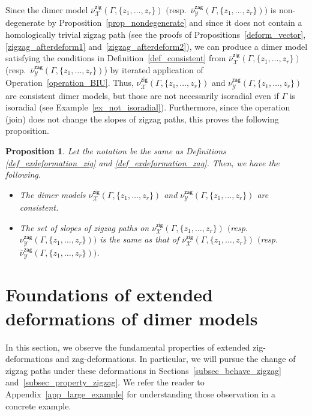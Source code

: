 \documentclass[11pt]{article}
\numberwithin{equation}{section}
\numberwithin{equation}{section}
\numberwithin{figure}{section}
\numberwithin{table}{section}
\newtheorem{Proposition}[Theorem]{Proposition}
 { \theoremstyle{definition}
\newtheorem{Definition}[Theorem]{Definition}
\newtheorem{Note}[Theorem]{Note}
\newtheorem{Example}[Theorem]{Example}
\newtheorem{Remark}[Theorem]{Remark}
\newtheorem{observation}[Theorem]{Observation}
\newtheorem{operation}[Theorem]{Operation}
\newtheorem{setting}[Theorem]{Setting}}
\newcommand{\calX}{\mathcal{X}}
\newcommand{\calY}{\mathcal{Y}}
\newcommand{\zig}{\mathsf{zig}}
\newcommand{\zag}{\mathsf{zag}}
\begin{document}
Since the dimer model $\overline{\nu}^\zig_\calX(\Gamma, \{z_1,\dots,z_r\})$ $($resp.\ $\overline{\nu}^\zag_\calY(\Gamma, \{z_1,\dots,z_r\})$$)$ is non-degenerate by Proposition~\ref{prop_nondegenerate}
and since it does not contain a homologically trivial zigzag path (see the proofs of Propositions~\ref{deform_vector}, \ref{zigzag_afterdeform1} and~\ref{zigzag_afterdeform2}),
we can produce a dimer model satisfying the conditions in Definition~\ref{def_consistent}
from $\overline{\nu}^\zig_\calX(\Gamma, \{z_1,\dots,z_r\})$ (resp.\ $\overline{\nu}^\zag_\calY(\Gamma, \{z_1,\dots,z_r\})$)
by iterated application of Operation~\ref{operation_BIU}.
Thus, $\nu^\zig_\calX(\Gamma, \{z_1,\dots,z_r\})$ and $\nu^\zag_\calY(\Gamma, \{z_1,\dots,z_r\})$ are consistent dimer models, but those are not necessarily isoradial even if $\Gamma$ is isoradial (see Example~\ref{ex_not_isoradial}).
Furthermore, since the operation (join) does not change the slopes of zigzag paths, this proves the following proposition.

\begin{Proposition}\label{prop_make_consistent}
Let the notation be the same as Definitions {\rm \ref{def_exdeformation_zig}} and {\rm \ref{def_exdeformation_zag}}.
Then, we have the following.
\begin{itemize}\itemsep=0pt
\item[\rm (1)] The dimer models $\nu^\zig_\calX(\Gamma, \{z_1,\dots,z_r\})$ and $\nu^\zag_\calY(\Gamma, \{z_1,\dots,z_r\})$ are consistent.
\item[\rm (2)] The set of slopes of zigzag paths on $\nu^\zig_\calX(\Gamma, \{z_1,\dots,z_r\})$ $($resp.\ $\nu^\zag_\calY(\Gamma, \{z_1,\dots,z_r\})$$)$
is the same as that of $\overline{\nu}^\zig_\calX(\Gamma, \{z_1,\dots,z_r\})$ $($resp.\ $\overline{\nu}^\zag_\calY(\Gamma, \{z_1,\dots,z_r\})$$)$.
\end{itemize}
\end{Proposition}


\section{Foundations of extended deformations of dimer models}\label{sec_proof}

In this section, we observe the fundamental properties of extended zig-deformations and zag-deformations.
In particular, we will pursue the change of zigzag paths under these deformations
in Sections~\ref{subsec_behave_zigzag} and~\ref{subsec_property_zigzag}.
We refer the reader to Appendix~\ref{app_large_example} for understanding those observation in a concrete example.
\end{document}
